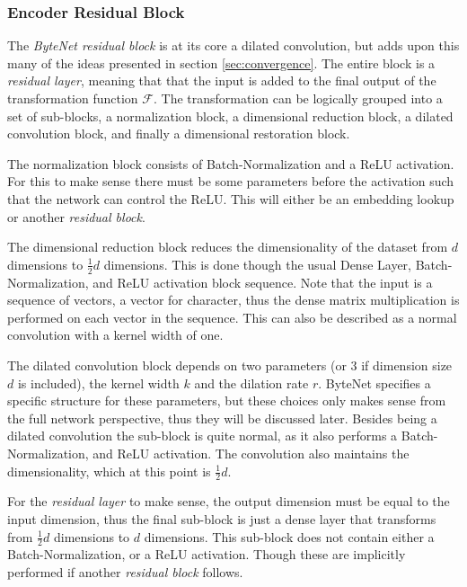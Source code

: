 \subsubsection{Encoder Residual Block}

The \textit{ByteNet residual block} is at its core a dilated convolution, but adds upon this many of the ideas presented in section \ref{sec:convergence}. The entire block is a \textit{residual layer}, meaning that that the input is added to the final output of the transformation function $\mathcal{F}$. The transformation can be logically grouped into a set of sub-blocks, a normalization block, a dimensional reduction block, a dilated convolution block, and finally a dimensional restoration block.

The normalization block consists of Batch-Normalization and a ReLU activation. For this to make sense there must be some parameters before the activation such that the network can control the ReLU. This will either be an embedding lookup or another \textit{residual block}.

The dimensional reduction block reduces the dimensionality of the dataset from $d$ dimensions to $\frac{1}{2}d$ dimensions. This is done though the usual Dense Layer, Batch-Normalization, and ReLU activation block sequence. Note that the input is a sequence of vectors, a vector for character, thus the dense matrix multiplication is performed on each vector in the sequence. This can also be described as a normal convolution with a kernel width of one.

\afterpage{\clearpage}

The dilated convolution block depends on two parameters (or 3 if dimension size $d$ is included), the kernel width $k$ and the dilation rate $r$. ByteNet specifies a specific structure for these parameters, but these choices only makes sense from the full network perspective, thus they will be discussed later. Besides being a dilated convolution the sub-block is quite normal, as it also performs a Batch-Normalization, and ReLU activation. The convolution also maintains the dimensionality, which at this point is $\frac{1}{2}d$.

For the \textit{residual layer} to make sense, the output dimension must be equal to the input dimension, thus the final sub-block is just a dense layer that transforms from $\frac{1}{2}d$ dimensions to $d$ dimensions. This sub-block does not contain either a Batch-Normalization, or a ReLU activation. Though these are implicitly performed if another \textit{residual block} follows.

